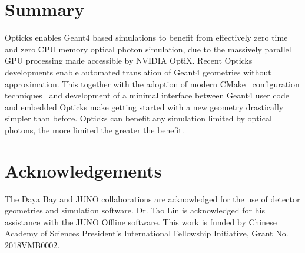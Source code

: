 \documentclass{webofc}
\begin{document}
\section{Summary}
%
Opticks enables Geant4 based simulations to benefit from effectively zero time 
and zero CPU memory optical photon simulation, due to the massively parallel GPU 
processing made accessible by NVIDIA OptiX.
Recent Opticks developments enable automated translation of Geant4 geometries without approximation. 
This together with the adoption of modern CMake~\cite{CMake} configuration techniques~\cite{BCM} and development of a 
minimal interface between Geant4 user code and embedded Opticks make getting started with a new geometry
drastically simpler than before.
Opticks can benefit any simulation limited by optical photons, the more limited the greater the 
benefit.
%
%
\section*{Acknowledgements}
%
The Daya Bay and JUNO collaborations are acknowledged for the use of detector 
geometries and simulation software. Dr. Tao Lin is acknowledged for his assistance with 
the JUNO Offline software. 
This work is funded by Chinese Academy of Sciences President’s International Fellowship Initiative,
Grant No. 2018VMB0002.
%
%
\end{document}
